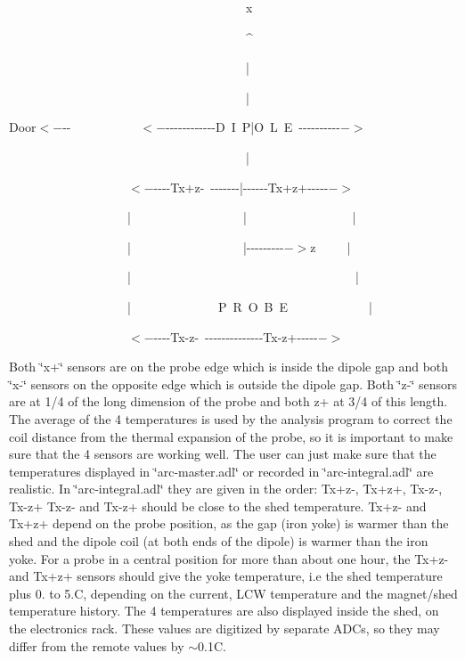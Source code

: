 \begin{lyxcode}
~~~~~~~~~~~~~~~~~~~~~~~~~~~~~~~~~~~~~~x~

~~~~~~~~~~~~~~~~~~~~~~~~~~~~~~~~~~~~~~\^{}~

~~~~~~~~~~~~~~~~~~~~~~~~~~~~~~~~~~~~~~|~

~~~~~~~~~~~~~~~~~~~~~~~~~~~~~~~~~~~~~~|~

Door$< -${}-{}-~~~~~~~~~~~$< 
-${}-{}-{}-{}-{}-{}-{}-{}-{}-{}-{}-{}-D~I~P|O~L~E~-{}-{}-{}-{}-{}-{}-{}-{}-{}-{}$-
>$~

~~~~~~~~~~~~~~~~~~~~~~~~~~~~~~~~~~~~~~|~

~~~~~~~~~~~~~~~~~~~$< 
-${}-{}-{}-{}-Tx+z-~-{}-{}-{}-{}-{}-{}-|-{}-{}-{}-{}-{}-Tx+z+-{}-{}-{}-{}-{}$->$~

~~~~~~~~~~~~~~~~~~~|~~~~~~~~~~~~~~~~~~|~~~~~~~~~~~~~~~~~|~

~~~~~~~~~~~~~~~~~~~|~~~~~~~~~~~~~~~~~~|-{}-{}-{}-{}-{}-{}-{}-{}-{}$->$z~~~~~|~

~~~~~~~~~~~~~~~~~~~|~~~~~~~~~~~~~~~~~~~~~~~~~~~~~~~~~~~~|~

~~~~~~~~~~~~~~~~~~~|~~~~~~~~~~~~~~P~R~O~B~E~~~~~~~~~~~~~|~

~~~~~~~~~~~~~~~~~~~$< 
-${}-{}-{}-{}-Tx-z-~-{}-{}-{}-{}-{}-{}-{}-{}-{}-{}-{}-{}-{}-Tx-z+-{}-{}-{}-{}-{}$-
>$
\end{lyxcode}

Both \char`\"{}x+\char`\"{} sensors are on the probe edge which is inside the
dipole gap and both \char`\"{}x-\char`\"{} sensors on the opposite edge which
is outside the dipole gap. Both \char`\"{}z-\char`\"{} sensors are at 1/4 of
the long dimension of the probe and both z+ at 3/4 of this length. The average
of the 4 temperatures is used by the analysis program to correct the coil distance
from the thermal expansion of the probe, so it is important to make sure that
the 4 sensors are working well. The user can just make sure that the temperatures
displayed in \char`\"{}arc-master.adl\char`\"{} or recorded in 
\char`\"{}arc-integral.adl\char`\"{}
are realistic. In \char`\"{}arc-integral.adl\char`\"{} they are given in the
order: Tx+z-, Tx+z+, Tx-z-, Tx-z+ Tx-z- and Tx-z+ should be close to the shed
temperature. Tx+z- and Tx+z+ depend on the probe position, as the gap (iron
yoke) is warmer than the shed and the dipole coil (at both ends of the dipole)
is warmer than the iron yoke. For a probe in a central position for more than
about one hour, the Tx+z- and Tx+z+ sensors should give the yoke temperature,
i.e the shed temperature plus 0. to 5.C, depending on the current, LCW temperature
and the magnet/shed temperature history. The 4 temperatures are also displayed
inside the shed, on the electronics rack. These values are digitized by separate
ADCs, so they may differ from the remote values by \( \sim  \)0.1C. 

